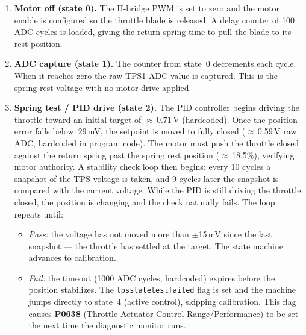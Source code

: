 \documentclass[a4paper,11pt]{article}
\renewcommand{\_}{\oldunderscore\allowbreak}
\begin{document}
\begin{enumerate}
	\item \textbf{Motor off (state 0).}
	      The H-bridge PWM is set to zero and the motor enable is configured so
	      the throttle blade is released. A delay counter of 100 ADC cycles is
	      loaded, giving the return spring time to pull the blade to its rest
	      position.

	\item \textbf{ADC capture (state 1).}
	      The counter from state~0 decrements each cycle. When it reaches zero
	      the raw TPS1 ADC value is captured. This is the spring-rest voltage
	      with no motor drive applied.

	\item \textbf{Spring test / PID drive (state 2).}
	      The PID controller begins driving the throttle toward
	      an initial target of $\approx$\,0.71\,V (hardcoded). Once the position error falls
	      below~29\,mV, the setpoint is moved to fully closed
	      ($\approx$\,0.59\,V raw ADC, hardcoded in program code). The motor
	      must push the throttle closed against the return spring past the
	      spring rest position ($\approx$\,18.5\%), verifying motor authority.
	      A stability check loop then begins: every 10 cycles a snapshot of
	      the TPS voltage is taken, and 9 cycles later the snapshot is
	      compared with the current voltage. While the PID is still driving
	      the throttle closed, the position is changing and the check
	      naturally fails. The loop repeats until:
	      \begin{itemize}
	      \item \emph{Pass:} the voltage has not moved more than
	            $\pm$15\,mV since the last snapshot --- the throttle has
	            settled at the target. The state machine advances to
	            calibration.
	      \item \emph{Fail:} the timeout (1000 ADC cycles, hardcoded) expires before
	            the position stabilizes. The
	            \texttt{tps\_state\_test\_failed} flag is set and the machine
	            jumps directly to state~4 (active control), skipping
	            calibration. This flag causes \textbf{P0638} (Throttle
	            Actuator Control Range/Performance) to be set the next time
	            the diagnostic monitor runs.
	      \end{itemize}


\end{enumerate}
\end{document}
